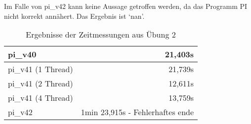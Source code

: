 \documentclass[12pt,a4paper]{article}
\begin{document}
Im Falle von pi\_v42 kann keine Aussage getroffen werden, da das Programm PI nicht korrekt annähert.
Das Ergebnis ist `nan'.

\begin{table}
\begin{tabular}{|l|r|}
\hline pi\_v40 & 21,403s \\ 
\hline pi\_v41 (1 Thread) & 21,739s \\ 
\hline pi\_v41 (2 Thread) & 12,611s \\ 
\hline pi\_v41 (4 Thread) & 13,759s \\ 
\hline pi\_v42 & 1min 23,915s - Fehlerhaftes ende \\ 
\hline 
\end{tabular} 
\caption{Ergebnisse der Zeitmessungen aus Übung 2}
\label{zeitmessung}
\end{table}
\end{document}
